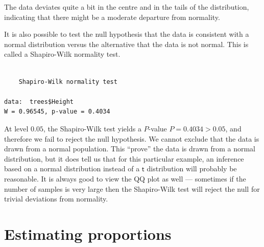 \documentclass[
  a4paper,
  DIV=11,
  numbers=noendperiod,
  oneside]{scrreprt}
\newenvironment{Shaded}{\begin{snugshade}}{\end{snugshade}}
\newcommand{\FunctionTok}[1]{\textcolor[rgb]{0.28,0.35,0.67}{#1}}
\newcommand{\NormalTok}[1]{\textcolor[rgb]{0.00,0.23,0.31}{#1}}
\newcommand{\SpecialCharTok}[1]{\textcolor[rgb]{0.37,0.37,0.37}{#1}}
\theoremstyle{plain}
\theoremstyle{definition}
\theoremstyle{definition}
\theoremstyle{definition}
\theoremstyle{plain}
\theoremstyle{remark}
\begin{document}
\begin{tcolorbox}
\begin{figure}[H]
\end{figure}%

The data deviates quite a bit in the centre and in the tails of the
distribution, indicating that there might be a moderate departure from
normality.

It is also possible to test the null hypothesis that the data is
consistent with a normal distribution versus the alternative that the
data is not normal. This is called a Shapiro-Wilk normality test.

\begin{Shaded}
\end{Shaded}

\begin{verbatim}

    Shapiro-Wilk normality test

data:  trees$Height
W = 0.96545, p-value = 0.4034
\end{verbatim}

At level \(0.05\), the Shapiro-Wilk test yields a \(P\)-value
\(P = 0.4034 > 0.05\), and therefore we fail to reject the null
hypothesis. We cannot exclude that the data is drawn from a normal
population. This ``prove'' the data is drawn from a normal distribution,
but it does tell us that for this particular example, an inference based
on a normal distribution instead of a \(\mathsf{t}\) distribution will
probably be reasonable. It is always good to view the QQ plot as well
--- sometimes if the number of samples is very large then the
Shapiro-Wilk test will reject the null for trivial deviations from
normality.

\end{tcolorbox}

\section{Estimating proportions}\label{sec-estimating-proportions}
\end{document}
